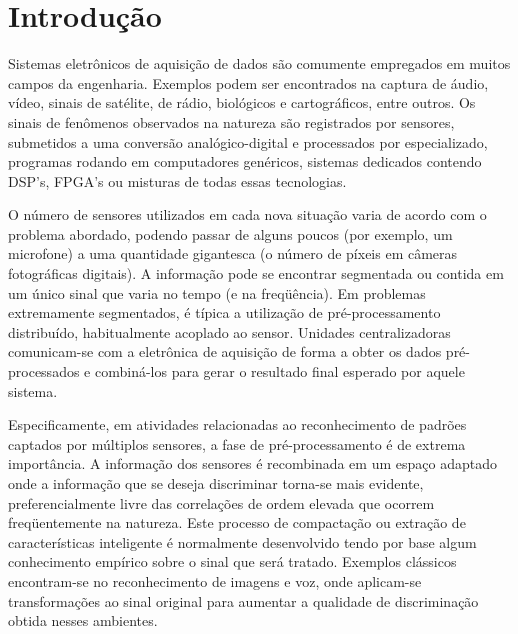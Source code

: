 \typeout{ ====================================================================}
\typeout{ ====================================================================}

\chapter{Introdução}

Sistemas eletrônicos de aquisição de dados são comumente empregados em muitos
campos da engenharia. Exemplos podem ser encontrados na captura de áudio,
vídeo, sinais de satélite, de rádio, biológicos e cartográficos, entre
outros. Os sinais de fenômenos observados na natureza são registrados por
sensores, submetidos a uma conversão analógico-digital e processados por
 especializado, programas rodando em computadores genéricos,
sistemas dedicados contendo DSP's, FPGA's ou misturas de todas essas
tecnologias.

O número de sensores utilizados em cada nova situação varia de acordo com o
problema abordado, podendo passar de alguns poucos (por exemplo, um microfone)
a uma quantidade gigantesca (o número de píxeis em câmeras fotográficas
digitais). A informação pode se encontrar segmentada ou contida em um único
sinal que varia no tempo (e na freqüência). Em problemas extremamente
segmentados, é típica a utilização de pré-processamento distribuído,
habitualmente acoplado ao sensor. Unidades centralizadoras comunicam-se com a
eletrônica de aquisição de forma a obter os dados pré-processados e
combiná-los para gerar o resultado final esperado por aquele sistema.

Especificamente, em atividades relacionadas ao reconhecimento de padrões
captados por múltiplos sensores, a fase de pré-processamento é de extrema
importância. A informação dos sensores é recombinada em um espaço adaptado
onde a informação que se deseja discriminar torna-se mais evidente,
preferencialmente livre das correlações de ordem elevada que ocorrem
freqüentemente na natureza. Este processo de compactação ou extração de
características inteligente é normalmente desenvolvido tendo por base algum
conhecimento empírico sobre o sinal que será tratado. Exemplos clássicos
encontram-se no reconhecimento de imagens e voz, onde aplicam-se
transformações ao sinal original para aumentar a qualidade de discriminação
obtida nesses ambientes.

